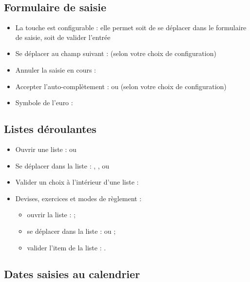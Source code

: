\subsection{Formulaire de saisie }

\begin{itemize}
	\item La touche  est configurable : elle permet soit de se déplacer dans le formulaire de saisie, soit de valider l'entrée
	\item Se déplacer au champ suivant :  (selon votre choix de configuration)
	\item Annuler la saisie en cours : 
	\item Accepter l'auto-complètement :  ou  (selon votre choix de configuration)
	\item  Symbole de l'euro : 
\end{itemize}


\subsection{Listes déroulantes}

\begin{itemize}
	 \item Ouvrir une liste :  ou 
	 \item Se déplacer dans la liste : , ,  ou 
	 \item Valider un choix à l'intérieur d'une liste : 
	 \item Devises, exercices et modes de règlement :
		\begin{itemize}
			\item ouvrir la liste :  ; 
			\item se déplacer dans la liste :  ou  ;
			\item valider l'item de la liste : .
		\end{itemize}
\end{itemize}


\subsection{Dates saisies au calendrier}


